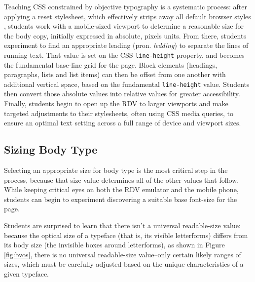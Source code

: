 \documentclass[sigplan,screen]{acmart}
\begin{document}
Teaching CSS constrained by objective typography is a systematic process: after applying a reset stylesheet, which effectively strips away all default browser styles \cite{em:rc}, students work with a mobile-sized viewport to determine a reasonable size for the body copy, initially expressed in absolute, pixels units. From there, students experiment to find an appropriate leading (pron. {\itshape ledding}) to separate the lines of running text. That value is set on the CSS \verb|line-height| property, and becomes the fundamental base-line grid for the page. Block elements (headings, paragraphs, lists and list items) can then be offset from one another with additional vertical space, based on the fundamental \verb|line-height| value. Students then convert those absolute values into relative values for greater accessibility. Finally, students begin to open up the RDV to larger viewports and make targeted adjustments to their stylesheets, often using CSS media queries, to ensure an optimal text setting across a full range of device and viewport sizes.

\subsection{Sizing Body Type}

Selecting an appropriate size for body type is the most critical step in the process, because that size value determines all of the other values that follow. While keeping critical eyes on both the RDV emulator and the mobile phone, students can begin to experiment discovering a suitable base font-size for the page.

Students are surprised to learn that there isn’t a universal readable-size value: because the optical size of a typeface (that is, its visible letterforms) differs from its body size (the invisible boxes around letterforms), as shown in Figure \ref{fig:bvos}, there is no universal readable-size value--only certain likely ranges of sizes, which must be carefully adjusted based on the unique characteristics of a given typeface.
\end{document}
